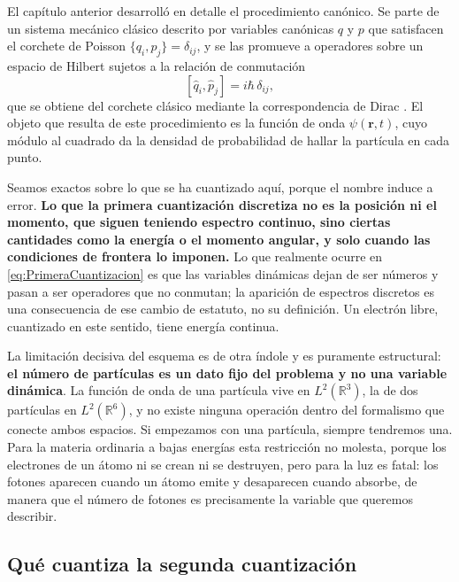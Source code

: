         El capítulo anterior desarrolló en detalle el procedimiento canónico. Se parte de un sistema mecánico clásico descrito por variables canónicas $q$ y $p$ que satisfacen el corchete de Poisson $\{q_{i},p_{j}\}=\delta_{ij}$, y se las promueve a operadores sobre un espacio de Hilbert sujetos a la relación de conmutación
        \begin{equation}\label{eq:PrimeraCuantizacion}
            \left[\hat{q}_{i},\hat{p}_{j}\right] = i\hbar\,\delta_{ij},
        \end{equation}
        que se obtiene del corchete clásico mediante la correspondencia de Dirac \cite{Dirac1930}. El objeto que resulta de este procedimiento es la función de onda $\psi(\mathbf{r},t)$, cuyo módulo al cuadrado da la densidad de probabilidad de hallar la partícula en cada punto.

        Seamos exactos sobre lo que se ha cuantizado aquí, porque el nombre induce a error. \textbf{Lo que la primera cuantización discretiza no es la posición ni el momento, que siguen teniendo espectro continuo, sino ciertas cantidades como la energía o el momento angular, y solo cuando las condiciones de frontera lo imponen.} Lo que realmente ocurre en \eqref{eq:PrimeraCuantizacion} es que las variables dinámicas dejan de ser números y pasan a ser operadores que no conmutan; la aparición de espectros discretos es una consecuencia de ese cambio de estatuto, no su definición. Un electrón libre, cuantizado en este sentido, tiene energía continua.

        La limitación decisiva del esquema es de otra índole y es puramente estructural: \textbf{el número de partículas es un dato fijo del problema y no una variable dinámica}. La función de onda de una partícula vive en $L^{2}(\mathbb{R}^{3})$, la de dos partículas en $L^{2}(\mathbb{R}^{6})$, y no existe ninguna operación dentro del formalismo que conecte ambos espacios. Si empezamos con una partícula, siempre tendremos una. Para la materia ordinaria a bajas energías esta restricción no molesta, porque los electrones de un átomo ni se crean ni se destruyen, pero para la luz es fatal: los fotones aparecen cuando un átomo emite y desaparecen cuando absorbe, de manera que el número de fotones es precisamente la variable que queremos describir.

    \subsection{Qué cuantiza la segunda cuantización}

